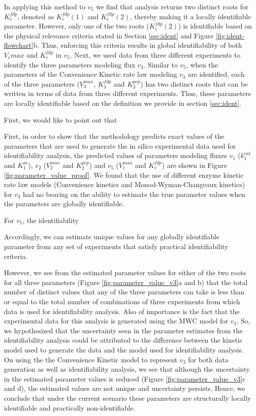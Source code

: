 \documentclass[10pt]{article}
\begin{document}
	In applying this method to $v_5$ we find that analysis returns two distinct roots for $K_e^{fdp}$, denoted as $K_e^{fdp}(1)$ and $K_e^{fdp}(2)$, thereby making it a locally identifiable parameter. However, only one of the two roots ($K_e^{fdp}(2)$) is identifiable based on the physical relevance criteria stated in Section \ref{sec:ident} and Figure \ref{fig:ident-flowchart}b. Thus, enforcing this criteria results in global identifiability of both $V_e{max}$ and $K_e^{fdp}$ in $v_5$. Next, we used data from three different experiments to identify the three parameters modeling flux $v_3$. Similar to $v_5$, when the parameters of the Convenience Kinetic rate law modeling $v_3$ are identified, each of the three parameters ($V_3^{max}$, $K_3^{fdp}$ and $K_3^{pep}$) has two distinct roots that can be written in terms of data from three different experiments. Thus, these parameters are locally identifiable based on the definition we provide in section \ref{sec:ident}. 
	
	
	
	First, we would like to point out that 
	
	First, in order to show that the methodology predicts exact values of the parameters that are used to generate the in silico experimental data used for identifiability analysis, the predicted values of parameters modeling fluxes $v_1$ ($k_1^{cat}$ and $K_1^{ac}$), $v_2$ ($V_2^{max}$ and $K_2^{pep}$) and $v_5$ ($V_e^{max}$ and $K_e^{fdp}$) are shown in Figure \ref{fig:parameter_value_proof}. We found that the use of different enzyme kinetic rate law models (Convenience kinetics and Monod-Wyman-Changeaux kinetics) for $v_3$ had no bearing on the ability to estimate the true parameter values when the parameters are globally identifiable.
	
	For $v_5$, the identifiability 
	
	 Accordingly, we can estimate unique values for any globally identifiable parameter from any set of experiments that satisfy practical identifiability criteria. 
	
	
	
	However, we see from the estimated parameter values for either of the two roots for all three parameters (Figure \ref{fig:parameter_value_v3}a and b) that the total number of distinct values that any of the three parameters can take is less than or equal to the total number of combinations of three experiments from which data is used for identifiability analysis. Also of importance is the fact that the experimental data for this analysis is generated using the MWC model for $v_3$. So, we hypothesized that the uncertainty seen in the parameter estimates from the identifiability analysis could be attributed to the difference between the kinetic model used to generate the data and the model used for identifiability analysis. On using the the Convenience Kinetic model to represent $v_3$ for both data generation as well as identifiability analysis, we see that although the uncertainty in the estimated parameter values is reduced (Figure \ref{fig:parameter_value_v3}c and d), the estimated values are not unique and uncertainty persists. Hence, we conclude that under the current scenario these parameters are structurally locally identifiable and practically non-identifiable. 
	
\end{document}
